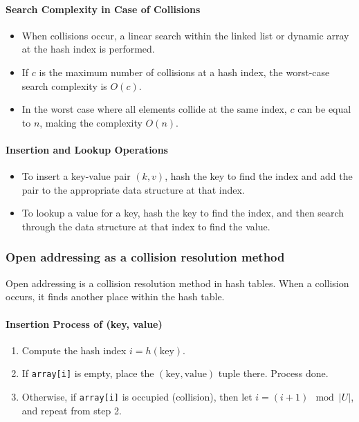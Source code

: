 \documentclass[12pt]{article}
\begin{document}
\paragraph{Search Complexity in Case of Collisions}
\begin{itemize}
    \item When collisions occur, a linear search within the linked list or dynamic array at the hash index is performed.
    \item If \( c \) is the maximum number of collisions at a hash index, the worst-case search complexity is \( O(c) \).
    \item In the worst case where all elements collide at the same index, \( c \) can be equal to \( n \), making the complexity \( O(n) \).
\end{itemize}

\paragraph{Insertion and Lookup Operations}
\begin{itemize}
    \item To insert a key-value pair \((k, v)\), hash the key to find the index and add the pair to the appropriate data structure at that index.
    \item To lookup a value for a key, hash the key to find the index, and then search through the data structure at that index to find the value.
\end{itemize}




\subsubsection{Open addressing as a collision resolution method}
Open addressing is a collision resolution method in hash tables. When a collision occurs, it finds another place within the hash table.

\paragraph{Insertion Process of (key, value)}
\begin{enumerate}
    \item Compute the hash index \( i = h(\text{key}) \).
    \item If \texttt{array[i]} is empty, place the \((\text{key}, \text{value})\) tuple there. Process done.
    \item Otherwise, if \texttt{array[i]} is occupied (collision), then let \( i = (i + 1) \mod |U| \), and repeat from step 2.
\end{enumerate}
\end{document}
